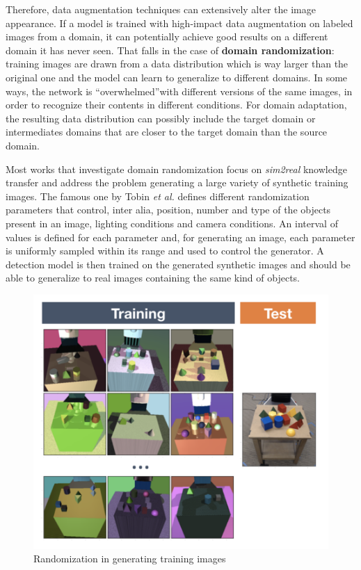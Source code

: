 \documentclass[%
    corpo=12pt,
    twoside,
    stile=classica,   
    tipotesi=magistrale,
    evenboxes,
    english
]{toptesi}
\begin{document}
Therefore, data augmentation techniques can extensively alter the image appearance. If a model is trained with high-impact data augmentation on labeled images from a domain, it can potentially achieve good results on a different domain it has never seen. That falls in the case of \textbf{domain randomization}: training images are drawn from a data distribution which is way larger than the original one and the model can learn to generalize to different domains. In some ways, the network is \textquotedblleft overwhelmed\textquotedblright with different versions of the same images, in order to recognize their contents in different conditions. For domain adaptation, the resulting data distribution can possibly include the target domain or intermediates domains that are closer to the target domain than the source domain.

Most works that investigate domain randomization focus on \textit{sim2real} knowledge transfer and address the problem generating a large variety of synthetic training images. The famous one by Tobin \textit{et al.}\cite{tobin2017domain} defines different randomization parameters that control, inter alia, position, number and type of the objects present in an image, lighting conditions and camera conditions. An interval of values is defined for each parameter and, for generating an image, each parameter is uniformly sampled within its range and used to control the generator. A detection model is then trained on the generated synthetic images and should be able to generalize to real images containing the same kind of objects.

\begin{figure}[ht!]
	\centering
	\includegraphics[width=0.6\linewidth]{imgs/randomization.png}
	\caption{Randomization in generating training images\cite{tobin2017domain}}
	\label{fig:randomization}
\end{figure}
\end{document}
